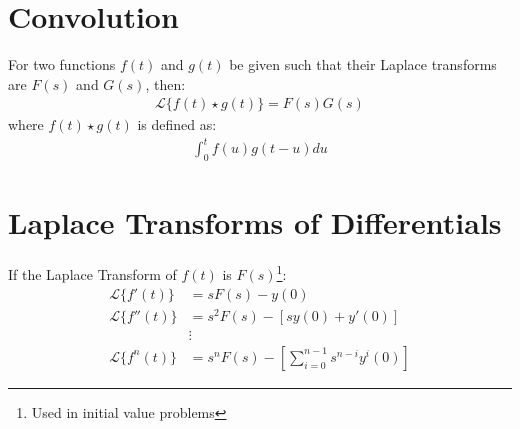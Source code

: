 \documentclass[../main.tex]{subfile}
\begin{document}
    \section{Convolution}
    For two functions $f(t)$ and $g(t)$ be given such that their Laplace transforms are $F(s)$ and $G(s)$, then:
    \begin{align}
        \mathcal{L}\lbrace f(t) \star g(t) \rbrace=F(s)G(s)
    \end{align}
    where $f(t) \star g(t)$ is defined as:
    \begin{align}
        \int_0^t f(u)g(t-u)du
    \end{align}

    \section{Laplace Transforms of Differentials}
    If the Laplace Transform of $f(t)$ is $F(s)$\footnote{Used in initial value problems}:
    \begin{align}
        \mathcal{L} \lbrace f'(t) \rbrace & = sF(s) - y(0)\\
        \mathcal{L} \lbrace f''(t) \rbrace & = s^2 F(s) - [s y(0) + y'(0)]\\
        &\vdots\nonumber\\
        \mathcal{L} \lbrace f^n(t) \rbrace & = s^n F(s) - \left[\sum_{i = 0}^{n - 1} s^{n - i} y^i(0) \right]
    \end{align}
\end{document}
